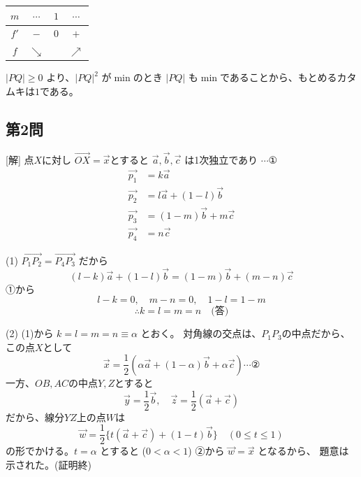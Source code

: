 \documentclass[../main.tex]{subfiles}
\begin{document}
\begin{center}
  \begin{tabular}{|c|c|c|c|}
    \hline
    $m$ & $\cdots$ & $1$ & $\cdots$ \\ \hline
    $f'$ & $-$ & $0$ & $+$ \\ \hline
    $f$ & $\searrow$ & & $\nearrow$ \\ \hline
  \end{tabular}
\end{center}

$|PQ| \ge 0$ より、$|PQ|^2$ が$\min$のとき $|PQ|$ も$\min$であることから、もとめるカタムキは$1$である。

\subsection*{第2問}
[解] 点$X$に対し $\overrightarrow{OX} = \vec{x}$とすると
$\vec{a}, \vec{b}, \vec{c}$ は1次独立であり $\cdots \text{①}$
\begin{align*}
  \vec{p_1} &= k\vec{a} \\
  \vec{p_2} &= l\vec{a} + (1-l)\vec{b} \\
  \vec{p_3} &= (1-m)\vec{b} + m\vec{c} \\
  \vec{p_4} &= n\vec{c}
\end{align*}

(1) $\overrightarrow{P_1P_2} = \overrightarrow{P_4P_3}$ だから
\[ (l-k)\vec{a} + (1-l)\vec{b} = (1-m)\vec{b} + (m-n)\vec{c} \]
①から
\[ l-k=0, \quad m-n=0, \quad 1-l=1-m \]
\[ \therefore k = l = m = n \quad \text{(答)} \]

(2) (1)から $k = l = m = n \equiv \alpha$ とおく。
対角線の交点は、$P_1P_3$の中点だから、この点$X$として
\[ \vec{x} = \frac{1}{2} \left( \alpha\vec{a} + (1-\alpha)\vec{b} + \alpha\vec{c} \right) \cdots \text{②} \]
一方、$OB, AC$の中点$Y, Z$とすると
\[ \vec{y} = \frac{1}{2}\vec{b}, \quad \vec{z} = \frac{1}{2}(\vec{a}+\vec{c}) \]
だから、線分$YZ$上の点$W$は
\[ \vec{w} = \frac{1}{2} \{t(\vec{a}+\vec{c}) + (1-t)\vec{b}\} \quad (0 \le t \le 1) \]
の形でかける。$t = \alpha$ とすると ($0 < \alpha < 1$) ②から $\vec{w} = \vec{x}$ となるから、
題意は示された。(証明終)
\end{document}

